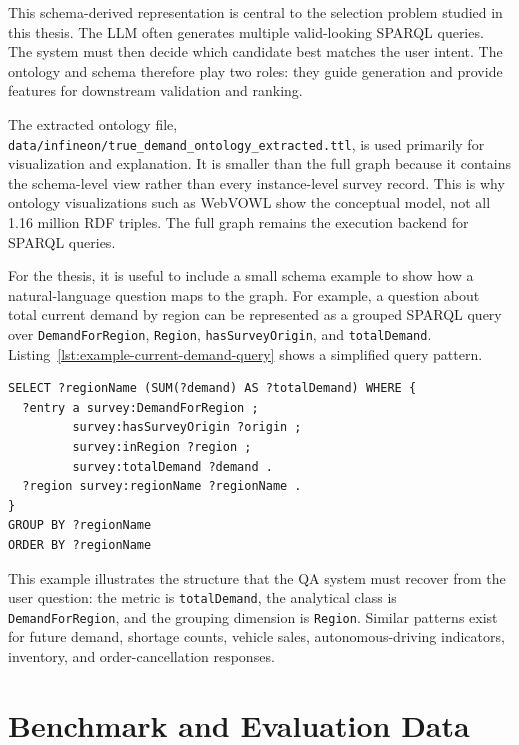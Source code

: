This schema-derived representation is central to the selection problem studied in this thesis. The LLM often generates multiple valid-looking SPARQL queries. The system must then decide which candidate best matches the user intent. The ontology and schema therefore play two roles: they guide generation and provide features for downstream validation and ranking.

The extracted ontology file, \texttt{data/infineon/true\_demand\_ontology\_extracted.ttl}, is used primarily for visualization and explanation. It is smaller than the full graph because it contains the schema-level view rather than every instance-level survey record. This is why ontology visualizations such as WebVOWL show the conceptual model, not all 1.16 million RDF triples. The full graph remains the execution backend for SPARQL queries.

For the thesis, it is useful to include a small schema example to show how a natural-language question maps to the graph. For example, a question about total current demand by region can be represented as a grouped SPARQL query over \texttt{DemandForRegion}, \texttt{Region}, \texttt{hasSurveyOrigin}, and \texttt{totalDemand}. Listing~\ref{lst:example-current-demand-query} shows a simplified query pattern.

\begin{lstlisting}[caption={Example graph-supported SPARQL query pattern for current demand by region.}, label={lst:example-current-demand-query}]
SELECT ?regionName (SUM(?demand) AS ?totalDemand) WHERE {
  ?entry a survey:DemandForRegion ;
         survey:hasSurveyOrigin ?origin ;
         survey:inRegion ?region ;
         survey:totalDemand ?demand .
  ?region survey:regionName ?regionName .
}
GROUP BY ?regionName
ORDER BY ?regionName
\end{lstlisting}

This example illustrates the structure that the QA system must recover from the user question: the metric is \texttt{totalDemand}, the analytical class is \texttt{DemandForRegion}, and the grouping dimension is \texttt{Region}. Similar patterns exist for future demand, shortage counts, vehicle sales, autonomous-driving indicators, inventory, and order-cancellation responses.

\section{Benchmark and Evaluation Data}
\label{sec:benchmark-evaluation-data}

